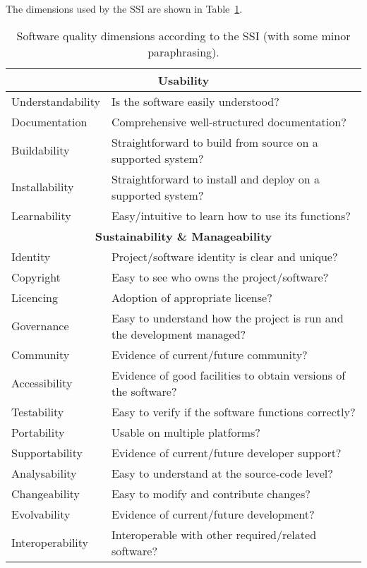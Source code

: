 \documentclass[a4paper,11pt]{article}
\begin{document}
The dimensions used by the SSI are shown in Table~\ref{tab:criteria}.

\begin{table}[hbt]
\begin{tabular}{l|l}
\hline
\multicolumn{2}{c}{\textbf{Usability}} \\
\hline
Understandability & Is the software easily understood? \\ 
Documentation & Comprehensive well-structured documentation? \\
Buildability  & Straightforward to build from source on a supported system? \\
Installability  & Straightforward to install and deploy on a supported system? \\
Learnability & Easy/intuitive to learn how to use its functions? \\
\hline
\multicolumn{2}{c}{\textbf{Sustainability \& Manageability}} \\
\hline
Identity & Project/software identity is clear and unique? \\
Copyright & Easy to see who owns the project/software? \\
Licencing & Adoption of appropriate license? \\
Governance & Easy to understand how the project is run and the development managed? \\
Community & Evidence of current/future community? \\
Accessibility & Evidence of good facilities to obtain versions of the software? \\
Testability & Easy to verify if the software functions correctly? \\
Portability & Usable on multiple platforms? \\
Supportability & Evidence of current/future developer support? \\
Analysability & Easy to understand at the source-code level? \\
Changeability & Easy to modify and contribute changes? \\
Evolvability & Evidence of current/future development? \\
Interoperability & Interoperable with other required/related software? \\
\hline
\end{tabular}
\caption{Software quality dimensions according to the SSI \citep{SSIGUIDE} (with some minor paraphrasing).}
\label{tab:criteria}
\end{table}
\end{document}

